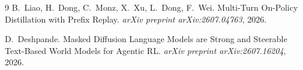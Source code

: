 \documentclass[11pt,a4paper]{article}
\begin{document}

\begin{thebibliography}{9}
B.~Liao, H.~Dong, C.~Monz, X.~Xu, L.~Dong, F.~Wei.
\newblock Multi-Turn On-Policy Distillation with Prefix Replay.
\newblock \emph{arXiv preprint arXiv:2607.04763}, 2026.

D.~Deshpande.
\newblock Masked Diffusion Language Models are Strong and Steerable Text-Based World Models for Agentic RL.
\newblock \emph{arXiv preprint arXiv:2607.16204}, 2026.
\end{thebibliography}
\end{document}
